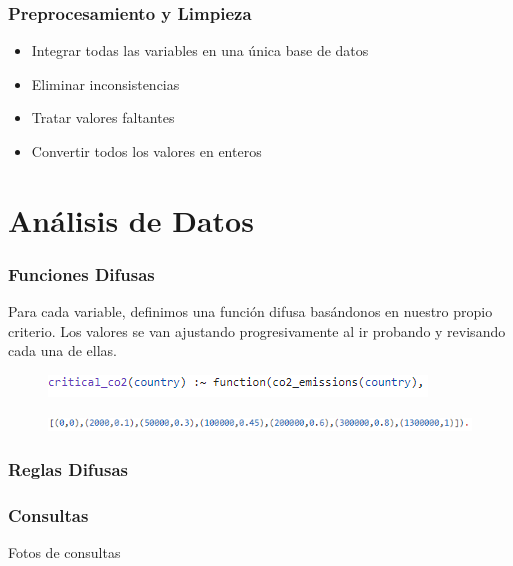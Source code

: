 \documentclass{beamer}
\newcommand{\slideauthor}[1]{\def\insertslideauthor{#1}}
\newcommand{\insertslideauthor}{}
\begin{document}
\begin{frame}
\frametitle{Preprocesamiento y Limpieza}
\slideauthor{Javier Comyn}
\begin{itemize}
    \item Integrar todas las variables en una única base de datos
    \item Eliminar inconsistencias
    \item Tratar valores faltantes
    \item Convertir todos los valores en enteros
\end{itemize}
\end{frame}

\section{Análisis de Datos}

\begin{frame}
\frametitle{Funciones Difusas}
\slideauthor{Javier Comyn}
Para cada variable, definimos una función difusa basándonos en nuestro propio criterio. Los valores se van ajustando progresivamente al ir probando y revisando cada una de ellas.
\vspace*{+5mm} %
\begin{figure}
\includegraphics[width=\textwidth]{Images/co2_1.png} 
\end{figure}
\vspace*{-5mm} %
\begin{figure}
\includegraphics[width=\textwidth]{Images/co2_2.png} 
\end{figure}
\end{frame}

\begin{frame}
\frametitle{Reglas Difusas}
\slideauthor{Javier Comyn}
\end{frame}

\begin{frame}
\frametitle{Consultas}
\slideauthor{Javier Comyn}
Fotos de consultas
\end{frame}
\end{document}
